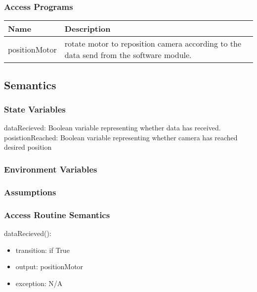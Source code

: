 \documentclass[12pt, titlepage]{article}
\begin{document}
\subsubsection{Access Programs}


\begin{center}
\begin{tabular}{p{4cm} p{8cm} }
\hline
\textbf{Name} & \textbf{Description}  \\
\hline
positionMotor & rotate motor to reposition camera according to the data send from the software module. \\
\hline

\end{tabular}
\end{center}

\subsection{Semantics}

\subsubsection{State Variables}

dataRecieved: Boolean variable representing whether data has received. \\
posistionReached: Boolean variable representing whether camera has reached desired position
\subsubsection{Environment Variables}



\subsubsection{Assumptions}


\subsubsection{Access Routine Semantics}

\noindent dataRecieved():
\begin{itemize}
\item transition: if True 
\item output: positionMotor 
\item exception: N/A 
\end{itemize}
\end{document}

